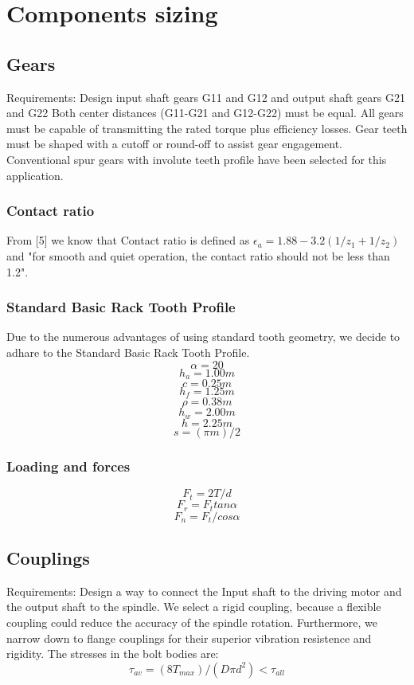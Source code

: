 \documentclass{article}
\begin{document}
\section{Components sizing}
\subsection{Gears}
Requirements: Design input shaft gears G11 and G12 and output shaft gears G21 and G22
Both center distances (G11-G21 and G12-G22) must be equal.
All gears must be capable of transmitting the rated torque  plus efficiency losses.
Gear teeth must be shaped with a cutoff or round-off to assist gear engagement.  %
Conventional spur gears with involute teeth profile have been selected for this application.
\subsubsection{Contact ratio}
From [5] we know that Contact ratio is defined as
$\epsilon_a = 1.88 - 3.2 (1/z_1 + 1/z_2)$ %
and "for smooth and quiet operation, the contact ratio should not be less than 1.2".
\subsubsection{Standard Basic Rack Tooth Profile}
Due to the numerous advantages of using standard tooth geometry, we decide to adhare to the Standard Basic Rack Tooth Profile.
$$\alpha = 20$$  %
$$h_a = 1.00m$$ %
$$c = 0.25m$$ %
$$h_f = 1.25m$$ %
$$\rho = 0.38m$$ %
$$h_w = 2.00m$$ %
$$h = 2.25m$$ %
$$s = (\pi m)/ 2$$ %
\subsubsection{Loading and forces}
$$F_t = 2T / d$$ %
$$F_r = F_t tan\alpha$$
$$F_n = F_t / cos \alpha $$ %

\subsection{Couplings}
Requirements: Design a way to connect the Input shaft to the driving motor and the output shaft to the spindle.
We select a rigid coupling, because a flexible coupling could reduce the accuracy of the spindle rotation.
Furthermore, we narrow down to flange couplings for their superior vibration resistence and rigidity.
The stresses in the bolt bodies are:
$$\tau_{av} = (8 T_{max}) / (D \pi d^2) < \tau_{all}$$  %
\end{document}
